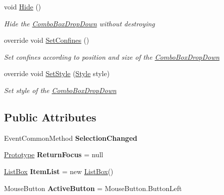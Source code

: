 \begin{DoxyCompactItemize}
void \mbox{\hyperlink{class_space_v_i_l_1_1_combo_box_drop_down_accb3813befaac8d9d0de181c37cf18ac}{Hide}} ()
\begin{DoxyCompactList}\small\item\em Hide the \mbox{\hyperlink{class_space_v_i_l_1_1_combo_box_drop_down}{Combo\+Box\+Drop\+Down}} without destroying \end{DoxyCompactList}\item 
override void \mbox{\hyperlink{class_space_v_i_l_1_1_combo_box_drop_down_a236066889e0b652410d02de2b4cb51c7}{Set\+Confines}} ()
\begin{DoxyCompactList}\small\item\em Set confines according to position and size of the \mbox{\hyperlink{class_space_v_i_l_1_1_combo_box_drop_down}{Combo\+Box\+Drop\+Down}} \end{DoxyCompactList}\item 
override void \mbox{\hyperlink{class_space_v_i_l_1_1_combo_box_drop_down_ad400783300d69cd5b90ebdb8400aa4a6}{Set\+Style}} (\mbox{\hyperlink{class_space_v_i_l_1_1_decorations_1_1_style}{Style}} style)
\begin{DoxyCompactList}\small\item\em Set style of the \mbox{\hyperlink{class_space_v_i_l_1_1_combo_box_drop_down}{Combo\+Box\+Drop\+Down}} \end{DoxyCompactList}\end{DoxyCompactItemize}
\subsection*{Public Attributes}
\begin{DoxyCompactItemize}
\item 
\mbox{\label{class_space_v_i_l_1_1_combo_box_drop_down_ac96d521707163db4efeee849aaba2da8}} 
Event\+Common\+Method {\bfseries Selection\+Changed}
\item 
\mbox{\label{class_space_v_i_l_1_1_combo_box_drop_down_a572453adc1203f9ca28076b98c2c6ab4}} 
\mbox{\hyperlink{class_space_v_i_l_1_1_prototype}{Prototype}} {\bfseries Return\+Focus} = null
\item 
\mbox{\label{class_space_v_i_l_1_1_combo_box_drop_down_a5a156dac090e076b885491125c247d63}} 
\mbox{\hyperlink{class_space_v_i_l_1_1_list_box}{List\+Box}} {\bfseries Item\+List} = new \mbox{\hyperlink{class_space_v_i_l_1_1_list_box}{List\+Box}}()
\item 
\mbox{\label{class_space_v_i_l_1_1_combo_box_drop_down_abc779543940e47666890dcab50ba0ea3}} 
Mouse\+Button {\bfseries Active\+Button} = Mouse\+Button.\+Button\+Left
\end{DoxyCompactItemize}
